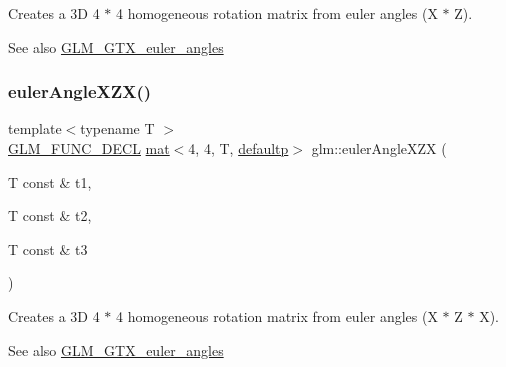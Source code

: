 Creates a 3D 4 $\ast$ 4 homogeneous rotation matrix from euler angles (X $\ast$ Z). \begin{DoxySeeAlso}{See also}
\mbox{\hyperlink{group__gtx__euler__angles}{G\+L\+M\+\_\+\+G\+T\+X\+\_\+euler\+\_\+angles}} 
\end{DoxySeeAlso}
\mbox{\label{group__gtx__euler__angles_ga60171c79a17aec85d7891ae1d1533ec9}} 
\subsubsection{\texorpdfstring{euler\+Angle\+X\+Z\+X()}{eulerAngleXZX()}}
{\footnotesize\ttfamily template$<$typename T $>$ \\
\mbox{\hyperlink{setup_8hpp_ab2d052de21a70539923e9bcbf6e83a51}{G\+L\+M\+\_\+\+F\+U\+N\+C\+\_\+\+D\+E\+CL}} \mbox{\hyperlink{structglm_1_1mat}{mat}}$<$4, 4, T, \mbox{\hyperlink{namespaceglm_a36ed105b07c7746804d7fdc7cc90ff25a9d21ccd8b5a009ec7eb7677befc3bf51}{defaultp}}$>$ glm\+::euler\+Angle\+X\+ZX (\begin{DoxyParamCaption}\item[{T const \&}]{t1,  }\item[{T const \&}]{t2,  }\item[{T const \&}]{t3 }\end{DoxyParamCaption})}

Creates a 3D 4 $\ast$ 4 homogeneous rotation matrix from euler angles (X $\ast$ Z $\ast$ X). \begin{DoxySeeAlso}{See also}
\mbox{\hyperlink{group__gtx__euler__angles}{G\+L\+M\+\_\+\+G\+T\+X\+\_\+euler\+\_\+angles}} 
\end{DoxySeeAlso}
\mbox{\label{group__gtx__euler__angles_ga996dce12a60d8a674ba6737a535fa910}} 
